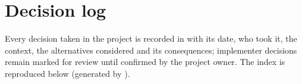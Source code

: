 \section{Decision log}
\label{app:decisions}
Every decision taken in the project is recorded in  with its date, who took it, the context, the alternatives considered and its consequences; implementer decisions remain marked for review until confirmed by the project owner. The index is reproduced below (generated by ).

{\small

}
